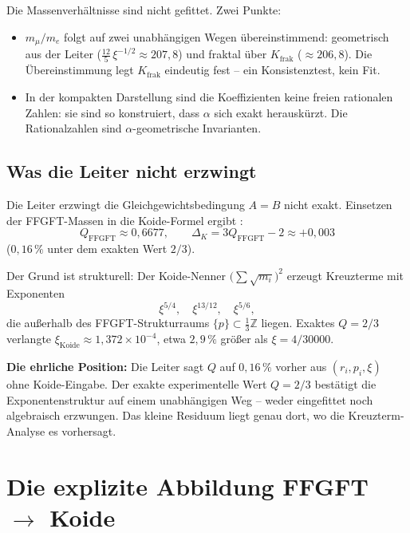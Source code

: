Die Massenverhältnisse sind nicht gefittet. Zwei Punkte:
\begin{itemize}
  \item \(m_\mu/m_e\) folgt auf zwei unabhängigen Wegen übereinstimmend:
        geometrisch aus der Leiter
        (\(\tfrac{12}{5}\,\xi^{-1/2} \approx 207{,}8\))
        und fraktal über \(K_{\text{frak}}\) (\(\approx 206{,}8\)).
        Die Übereinstimmung legt \(K_{\text{frak}}\) eindeutig fest --
        ein Konsistenztest, kein Fit.
  \item In der kompakten Darstellung sind die Koeffizienten keine freien
        rationalen Zahlen: sie sind so konstruiert, dass \(\alpha\) sich
        exakt herauskürzt. Die Rationalzahlen sind \(\alpha\)-geometrische
        Invarianten.
\end{itemize}

\subsection*{Was die Leiter nicht erzwingt}

Die Leiter erzwingt die Gleichgewichtsbedingung \(A = B\) nicht exakt.
Einsetzen der FFGFT-Massen in die Koide-Formel ergibt \cite{PascherDok192}:
\begin{equation}
  Q_{\text{FFGFT}} \approx 0{,}6677,
  \qquad
  \Delta_K = 3Q_{\text{FFGFT}} - 2 \approx +0{,}003
\end{equation}
(\(0{,}16\,\%\) unter dem exakten Wert \(2/3\)).

Der Grund ist strukturell: Der Koide-Nenner \(\bigl(\sum\sqrt{m_i}\bigr)^2\)
erzeugt Kreuzterme mit Exponenten
\begin{equation}
  \xi^{5/4}, \quad \xi^{13/12}, \quad \xi^{5/6},
\end{equation}
die außerhalb des FFGFT-Strukturraums
\(\{p\} \subset \tfrac{1}{3}\mathbb{Z}\) liegen.
Exaktes \(Q = 2/3\) verlangte \(\xi_{\text{Koide}} \approx 1{,}372\times10^{-4}\),
etwa \(2{,}9\,\%\) größer als \(\xi = 4/30000\).

\textbf{Die ehrliche Position:}
Die Leiter sagt \(Q\) auf \(0{,}16\,\%\) vorher aus
\((r_i, p_i, \xi)\) ohne Koide-Eingabe.
Der exakte experimentelle Wert \(Q = 2/3\) bestätigt die
Exponentenstruktur auf einem unabhängigen Weg --
weder eingefittet noch algebraisch erzwungen.
Das kleine Residuum liegt genau dort,
wo die Kreuzterm-Analyse es vorhersagt.

\section{Die explizite Abbildung FFGFT \texorpdfstring{\(\to\)}{→} Koide}

